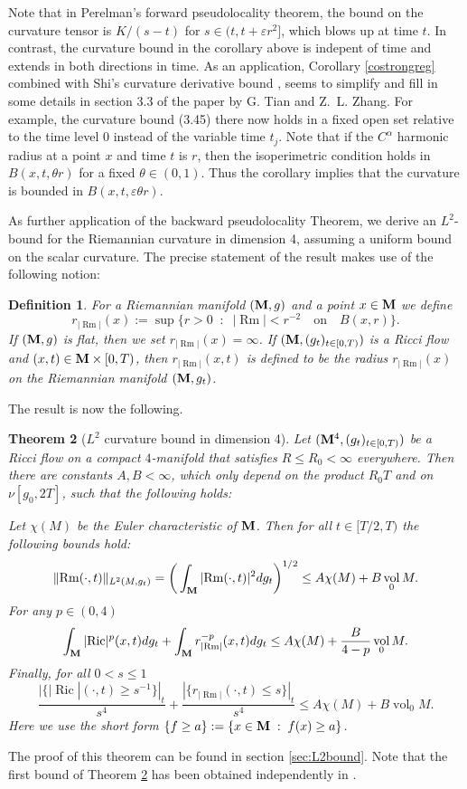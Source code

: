 \documentclass[11pt]{amsart}
\numberwithin{equation}{section}
\newtheorem{theorem}{Theorem}[section]
\newtheorem{definition}[theorem]{Definition}
\def\eps{\varepsilon}
\def\a{\alpha}
\def\M{{\bf M}}
\def\eps{\varepsilon}
\DeclareMathOperator{\Ric}{Ric}
\DeclareMathOperator{\Rm}{Rm}
\DeclareMathOperator{\vol}{vol}
\newcommand{\rrm}{r_{|{\Rm}|}}
\numberwithin{equation}{section}
\begin{document}
Note that in Perelman's forward pseudolocality theorem, the bound on the curvature tensor is $K/(s-t)$ for $s \in (t, t+ \varepsilon r^2]$, which blows up at time $t$. 
In contrast, the curvature bound in the corollary above is indepent of time and extends in both directions in time. 
As an application, Corollary \ref{costrongreg} combined with Shi's curvature derivative bound \cite{Sh:1}, seems to simplify and fill in some details in section 3.3 of the paper \cite{TZz:1} by G. Tian and Z.~L. Zhang. 
For example, the curvature bound (3.45) there now holds in a fixed open set relative
to the time level $0$ instead of the variable time $t_j$.
Note that if the $C^\a$ harmonic radius at a point $x$ and time $t$ is $r$, then the isoperimetric condition holds in $B(x, t, \theta r)$ for a fixed $\theta \in (0, 1)$.
Thus the corollary implies that the curvature is bounded in $B(x, t, \eps \theta r)$. 

As further application of the backward pseudolocality Theorem, we derive an $L^2$-bound for the Riemannian curvature in dimension 4, assuming a uniform bound on the scalar curvature.
The precise statement of the result makes use of the following notion:

\begin{definition} \label{Def:rho}
For a Riemannian manifold $(\M, g)$ and a point $x \in \M$ we define
\[ \rrm (x) := \sup \big\{ r > 0 \;\; : \;\; |{\Rm}| < r^{-2} \quad \text{on} \quad B(x, r) \big\}. \]
If $(\M, g)$ is flat, then we set $\rrm (x) = \infty$.
If $(\M, (g_t)_{t \in [0,T)})$ is a Ricci flow and $(x,t) \in \M \times [0,T)$, then $\rrm (x,t)$ is defined to be the radius $\rrm (x)$ on the Riemannian manifold $(\M , g_t)$.
\end{definition}
 
The result is now the following.

\begin{theorem}[$L^2$ curvature bound in dimension 4] \label{Thm:L2bound}
Let $(\M^4, (g_t)_{t \in [0,T)})$ be a Ricci flow on a compact $4$-manifold that satisfies $R  \leq R_0 < \infty$ everywhere.
Then there are constants $A, B < \infty$, which only depend on the product $R_0 T$ and on $\nu[g_0, 2T]$, such that the following holds:

Let $\chi (M)$ be the Euler characteristic of $\M$.
Then for all $t \in [T/2, T)$ the following bounds hold:
\[ \Vert {\Rm} (\cdot, t) \Vert_{L^2 (M, g_t)} = \bigg( \int_{\M} |{\Rm}(\cdot, t) |^2 dg_t \bigg)^{1/2}   \leq A \chi(M) + B \vol_0 M. \]
For any $p \in (0, 4)$
\[ \int_{\M} | {\Ric} |^p(x, t) dg_t + \int_{\M} \rrm^{-p} (x, t)  d g_t \leq A \chi ( M  )+ \frac{B}{4-p} \vol_0 M. \]
Finally, for all $0 < s \leq 1$
\[ \frac{| \{ |{\Ric}| (\cdot, t) \geq s^{-1} \} |_t }{s^4} + \frac{| \{ \rrm (\cdot, t) \leq s \} |_t }{s^4}  \leq A \chi ( M ) + B \vol_0 M . \]
Here we use the short form $\{ f \geq a \} := \{ x \in \M \; : \; f(x) \geq a \}$.
\end{theorem}
The proof of this theorem can be found in section \ref{sec:L2bound}.
Note that the first bound of Theorem \ref{Thm:L2bound} has been obtained independently in \cite{Simon:1}.
\end{document}

